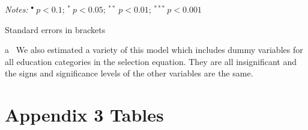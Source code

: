 \documentclass[a4paper,12pt]{article}
\begin{document}
{\begin{threeparttable}
\begin{small}
\begin{tabular}{lrcl}
\\
\hline
\end{tabular} 
\end{small}
 \begin{tablenotes}
  \begin{footnotesize}
 \item \textit{Notes:} \hspace{0.2cm}$^{\bullet}~p<0.1$; $^{*}~p<0.05$; $^{**}~p<0.01$; $^{***}~p<0.001$
\item[]   \begin{adjustwidth}{1cm}{}Standard errors in brackets \vspace{0.2cm}
 \item[a]~We also estimated a variety of this model which includes dummy variables for all education categories in the selection equation. They are all insignificant and the signs and significance levels of the other variables are the same.
     \end{adjustwidth}  
 \singlespacing
  \end{footnotesize}
\end{tablenotes}
  \end{threeparttable} 
\par}
\linespread{1}









\section{Appendix 3 Tables}
\end{document}
